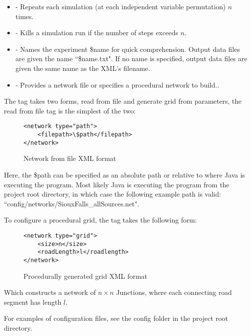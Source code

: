 \begin{itemize}
    \item {} \; - \; Repeats each simulation (at each independent variable permutation) $n$ times.
    \item {} \; - \; Kills a simulation run if the number of steps exceeds $n$.
    \item {} \; - \; Names the experiment \$name for quick comprehension. Output data files are given the name ``\$name.txt". If no name is specified, output data files are given the same name as the XML's filename.
    \item {} \; - \; Provides a network file or specifies a procedural network to build..
\end{itemize}

The  tag takes two forms, read from file and generate grid from parameters, the read from file tag is the simplest of the two:

\vspace{0.5cm}
\begin{figure}[H]
        \centering
        \begin{BVerbatim}[fontsize=\small]
<network type="path">
    <filepath>\$path</filepath>
</network>
        \end{BVerbatim}
    \caption{Network from file XML format}
    \label{fig:xml_fileNet}
\end{figure}

\begin{sloppypar}
Here, the \$path can be specified as an absolute path or relative to where Java is executing the program. Most likely Java is executing the program from the project root directory, in which case the following example path is valid:\\ ``config/networks/SiouxFalls\_allSources.net".
\end{sloppypar}

To configure a procedural grid, the  tag takes the following form: 

\vspace{0.5cm}
\begin{figure}[H]
        \centering
        \begin{BVerbatim}[fontsize=\small]
<network type="grid">
    <size>n</size>
    <roadLength>l</roadlength>
</network>
        \end{BVerbatim}
    \caption{Procedurally generated grid XML format}
    \label{fig:xml_gridNet}
\end{figure}

Which constructs a network of $n \times n$ Junctions, where each connecting road segment has length $l$.

For examples of configuration files, see the config folder in the project root directory.